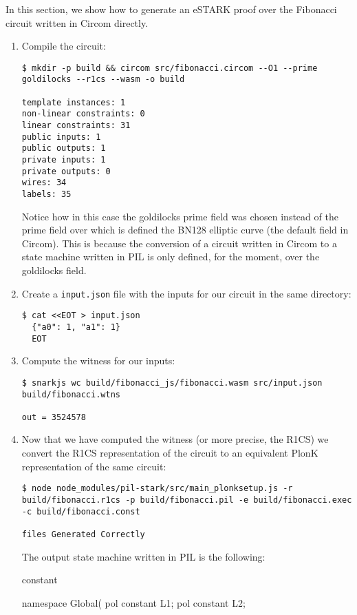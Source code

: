 In this section, we show how to generate an eSTARK proof over the Fibonacci circuit written in Circom directly.
\begin{enumerate}
\item Compile the circuit:
\begin{lstlisting}[style=termt]
$ mkdir -p build && circom src/fibonacci.circom --O1 --prime goldilocks --r1cs --wasm -o build

template instances: 1
non-linear constraints: 0
linear constraints: 31
public inputs: 1
public outputs: 1
private inputs: 1
private outputs: 0
wires: 34
labels: 35
\end{lstlisting}
Notice how in this case the goldilocks prime field was chosen instead of the prime field over which is defined the BN128 elliptic curve (the default field in Circom). This is because the conversion of a circuit written in Circom to a state machine written in PIL is only defined, for the moment, over the goldilocks field.

\item Create a \texttt{input.json} file with the inputs for our circuit in the same directory:
\begin{lstlisting}[style=termt]
$ cat <<EOT > input.json
  {"a0": 1, "a1": 1}
  EOT
\end{lstlisting}

\item Compute the witness for our inputs:
\begin{lstlisting}[style=termt]
$ snarkjs wc build/fibonacci_js/fibonacci.wasm src/input.json build/fibonacci.wtns

out = 3524578
\end{lstlisting}

\item Now that we have computed the witness (or more precise, the R1CS) we convert the R1CS representation of the circuit to an equivalent PlonK representation of the same circuit:
\begin{lstlisting}[style=termt]
$ node node_modules/pil-stark/src/main_plonksetup.js -r build/fibonacci.r1cs -p build/fibonacci.pil -e build/fibonacci.exec -c build/fibonacci.const

files Generated Correctly
\end{lstlisting}
The output state machine written in PIL is the following:
\begin{pil}
constant %

namespace Global(%
    pol constant L1;
    pol constant L2;


\end{pil}
\end{enumerate}
